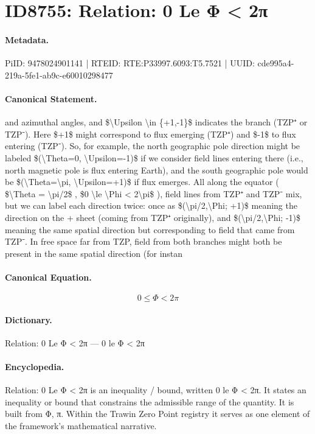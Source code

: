 \section*{ID8755: Relation: 0 Le Φ < 2π}
\paragraph{Metadata.}
PiID: 9478024901141 | RTEID: RTE:P33997.6093:T5.7521 | UUID: cde995a4-219a-5fe1-ab9c-e60010298477

\paragraph{Canonical Statement.}
and azimuthal angles, and \$\textbackslash{}Upsilon \textbackslash{}in \{+1,-1\}\$ indicates the branch (TZP⁺ or TZP⁻). Here \$+1\$ might correspond to flux emerging (TZP⁺) and \$-1\$ to flux entering (TZP⁻). So, for example, the north geographic pole direction might be labeled \$(\textbackslash{}Theta=0, \textbackslash{}Upsilon=-1)\$ if we consider field lines entering there (i.e., north magnetic pole is flux entering Earth), and the south geographic pole would be \$(\textbackslash{}Theta=\textbackslash{}pi, \textbackslash{}Upsilon=+1)\$ if flux emerges. All along the equator ( \$\textbackslash{}Theta = \textbackslash{}pi/2\$ , \$0 \textbackslash{}le \textbackslash{}Phi < 2\textbackslash{}pi\$ ), field lines from TZP⁺ and TZP⁻ mix, but we can label each direction twice: once as \$(\textbackslash{}pi/2,\textbackslash{}Phi; +1)\$ meaning the direction on the + sheet (coming from TZP⁺ originally), and \$(\textbackslash{}pi/2,\textbackslash{}Phi; -1)\$ meaning the same spatial direction but corresponding to field that came from TZP⁻. In free space far from TZP, field from both branches might both be present in the same spatial direction (for instan

\paragraph{Canonical Equation.}
\[
0 \le \Phi < 2\pi
\]

\paragraph{Dictionary.}
Relation: 0 Le Φ < 2π — 0 le Φ < 2π

\paragraph{Encyclopedia.}
Relation: 0 Le Φ < 2π is an inequality / bound, written 0 le Φ < 2π. It states an inequality or bound that constrains the admissible range of the quantity. It is built from Φ, π. Within the Trawin Zero Point registry it serves as one element of the framework's mathematical narrative.
